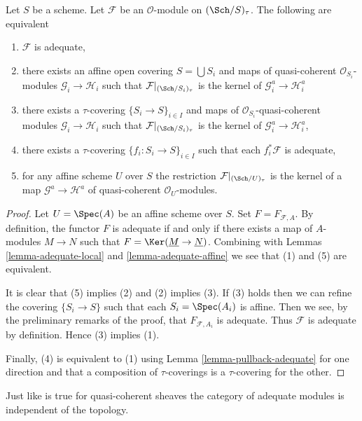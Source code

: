\begin{lemma}
\label{lemma-adequate-characterize}
Let $S$ be a scheme. Let $\mathcal{F}$ be an $\mathcal{O}$-module on
$(\Sch/S)_\tau$. The following are equivalent
\begin{enumerate}
\item $\mathcal{F}$ is adequate,
\item there exists an affine open covering $S = \bigcup S_i$ and
maps of quasi-coherent $\mathcal{O}_{S_i}$-modules
$\mathcal{G}_i \to \mathcal{H}_i$
such that $\mathcal{F}|_{(\Sch/S_i)_\tau}$ is the
kernel of $\mathcal{G}_i^a \to \mathcal{H}_i^a$
\item there exists a $\tau$-covering $\{S_i \to S\}_{i \in I}$ and
maps of $\mathcal{O}_{S_i}$-quasi-coherent modules
$\mathcal{G}_i \to \mathcal{H}_i$
such that $\mathcal{F}|_{(\Sch/S_i)_\tau}$ is the
kernel of $\mathcal{G}_i^a \to \mathcal{H}_i^a$,
\item there exists a $\tau$-covering $\{f_i : S_i \to S\}_{i \in I}$
such that each $f_i^*\mathcal{F}$ is adequate,
\item for any affine scheme $U$ over $S$ the restriction
$\mathcal{F}|_{(\Sch/U)_\tau}$ is the kernel
of a map $\mathcal{G}^a \to \mathcal{H}^a$ of quasi-coherent
$\mathcal{O}_U$-modules.
\end{enumerate}
\end{lemma}

\begin{proof}
Let $U = \Spec(A)$ be an affine scheme over $S$.
Set $F = F_{\mathcal{F}, A}$. By definition, the functor
$F$ is adequate if and only if there exists a map of $A$-modules
$M \to N$ such that $F = \Ker(\underline{M} \to \underline{N})$.
Combining with
Lemmas \ref{lemma-adequate-local} and
\ref{lemma-adequate-affine}
we see that (1) and (5) are equivalent.

\medskip\noindent
It is clear that (5) implies (2) and (2) implies (3).
If (3) holds then we can refine the covering
$\{S_i \to S\}$ such that each $S_i = \Spec(A_i)$ is affine.
Then we see, by the preliminary remarks of the proof, that
$F_{\mathcal{F}, A_i}$ is adequate. Thus $\mathcal{F}$
is adequate by definition. Hence (3) implies (1).

\medskip\noindent
Finally, (4) is equivalent to (1) using
Lemma \ref{lemma-pullback-adequate}
for one direction and that
a composition of $\tau$-coverings is a $\tau$-covering for the other.
\end{proof}

\noindent
Just like is true for quasi-coherent sheaves the category of
adequate modules is independent of the topology.


